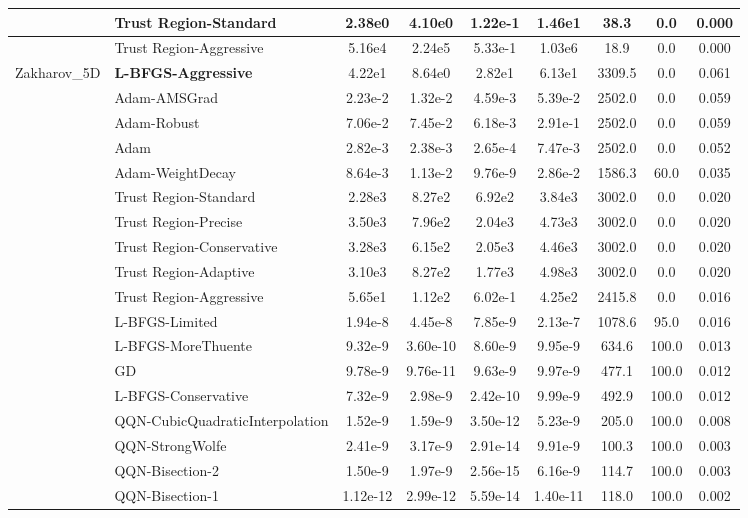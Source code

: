\documentclass{article}
\begin{document}
\begin{longtable}{|l|l|c|c|c|c|c|c|c|}
\hline
 & Trust Region-Standard & 2.38e0 & 4.10e0 & 1.22e-1 & 1.46e1 & 38.3 & 0.0 & 0.000 \\
\hline
 & Trust Region-Aggressive & 5.16e4 & 2.24e5 & 5.33e-1 & 1.03e6 & 18.9 & 0.0 & 0.000 \\
Zakharov\_5D & \textbf{L-BFGS-Aggressive} & 4.22e1 & 8.64e0 & 2.82e1 & 6.13e1 & 3309.5 & 0.0 & 0.061 \\
\hline
 & Adam-AMSGrad & 2.23e-2 & 1.32e-2 & 4.59e-3 & 5.39e-2 & 2502.0 & 0.0 & 0.059 \\
\hline
 & Adam-Robust & 7.06e-2 & 7.45e-2 & 6.18e-3 & 2.91e-1 & 2502.0 & 0.0 & 0.059 \\
\hline
 & Adam & 2.82e-3 & 2.38e-3 & 2.65e-4 & 7.47e-3 & 2502.0 & 0.0 & 0.052 \\
\hline
 & Adam-WeightDecay & 8.64e-3 & 1.13e-2 & 9.76e-9 & 2.86e-2 & 1586.3 & 60.0 & 0.035 \\
\hline
 & Trust Region-Standard & 2.28e3 & 8.27e2 & 6.92e2 & 3.84e3 & 3002.0 & 0.0 & 0.020 \\
\hline
 & Trust Region-Precise & 3.50e3 & 7.96e2 & 2.04e3 & 4.73e3 & 3002.0 & 0.0 & 0.020 \\
\hline
 & Trust Region-Conservative & 3.28e3 & 6.15e2 & 2.05e3 & 4.46e3 & 3002.0 & 0.0 & 0.020 \\
\hline
 & Trust Region-Adaptive & 3.10e3 & 8.27e2 & 1.77e3 & 4.98e3 & 3002.0 & 0.0 & 0.020 \\
\hline
 & Trust Region-Aggressive & 5.65e1 & 1.12e2 & 6.02e-1 & 4.25e2 & 2415.8 & 0.0 & 0.016 \\
\hline
 & L-BFGS-Limited & 1.94e-8 & 4.45e-8 & 7.85e-9 & 2.13e-7 & 1078.6 & 95.0 & 0.016 \\
\hline
 & L-BFGS-MoreThuente & 9.32e-9 & 3.60e-10 & 8.60e-9 & 9.95e-9 & 634.6 & 100.0 & 0.013 \\
\hline
 & GD & 9.78e-9 & 9.76e-11 & 9.63e-9 & 9.97e-9 & 477.1 & 100.0 & 0.012 \\
\hline
 & L-BFGS-Conservative & 7.32e-9 & 2.98e-9 & 2.42e-10 & 9.99e-9 & 492.9 & 100.0 & 0.012 \\
\hline
 & QQN-CubicQuadraticInterpolation & 1.52e-9 & 1.59e-9 & 3.50e-12 & 5.23e-9 & 205.0 & 100.0 & 0.008 \\
\hline
 & QQN-StrongWolfe & 2.41e-9 & 3.17e-9 & 2.91e-14 & 9.91e-9 & 100.3 & 100.0 & 0.003 \\
\hline
 & QQN-Bisection-2 & 1.50e-9 & 1.97e-9 & 2.56e-15 & 6.16e-9 & 114.7 & 100.0 & 0.003 \\
\hline
 & QQN-Bisection-1 & 1.12e-12 & 2.99e-12 & 5.59e-14 & 1.40e-11 & 118.0 & 100.0 & 0.002 \\

\end{longtable}
\end{document}
